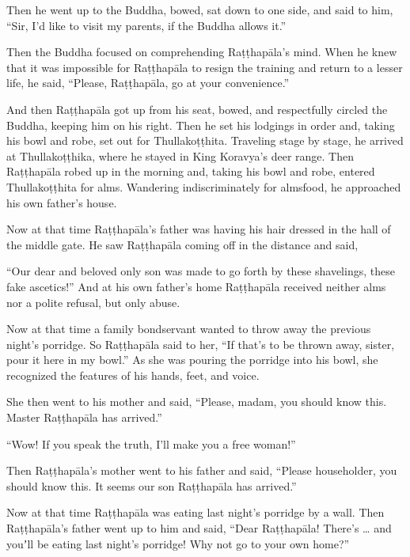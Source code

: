 \documentclass[12pt,openany]{book}%
\begin{document}
Then he went up to the Buddha, bowed, sat down to one side, and said to him, “Sir, I’d like to visit my parents, if the Buddha allows it.” 

Then the Buddha focused on comprehending \textsanskrit{Raṭṭhapāla}’s mind. When he knew that it was impossible for \textsanskrit{Raṭṭhapāla} to resign the training and return to a lesser life, he said, “Please, \textsanskrit{Raṭṭhapāla}, go at your convenience.” 

And then \textsanskrit{Raṭṭhapāla} got up from his seat, bowed, and respectfully circled the Buddha, keeping him on his right. Then he set his lodgings in order and, taking his bowl and robe, set out for \textsanskrit{Thullakoṭṭhita}. Traveling stage by stage, he arrived at \textsanskrit{Thullakoṭṭhika}, where he stayed in King Koravya’s deer range. Then \textsanskrit{Raṭṭhapāla} robed up in the morning and, taking his bowl and robe, entered \textsanskrit{Thullakoṭṭhita} for alms. Wandering indiscriminately for almsfood, he approached his own father’s house. 

Now at that time \textsanskrit{Raṭṭhapāla}’s father was having his hair dressed in the hall of the middle gate. He saw \textsanskrit{Raṭṭhapāla} coming off in the distance and said, 

“Our dear and beloved only son was made to go forth by these shavelings, these fake ascetics!” And at his own father’s home \textsanskrit{Raṭṭhapāla} received neither alms nor a polite refusal, but only abuse. 

Now at that time a family bondservant wanted to throw away the previous night’s porridge. So \textsanskrit{Raṭṭhapāla} said to her, “If that’s to be thrown away, sister, pour it here in my bowl.” As she was pouring the porridge into his bowl, she recognized the features of his hands, feet, and voice. 

She then went to his mother and said, “Please, madam, you should know this. Master \textsanskrit{Raṭṭhapāla} has arrived.” 

“Wow! If you speak the truth, I’ll make you a free woman!” 

Then \textsanskrit{Raṭṭhapāla}’s mother went to his father and said, “Please householder, you should know this. It seems our son \textsanskrit{Raṭṭhapāla} has arrived.” 

Now at that time \textsanskrit{Raṭṭhapāla} was eating last night’s porridge by a wall. Then \textsanskrit{Raṭṭhapāla}’s father went up to him and said, “Dear \textsanskrit{Raṭṭhapāla}! There’s … and youʼll be eating last night’s porridge! Why not go to your own home?” 
\end{document}
